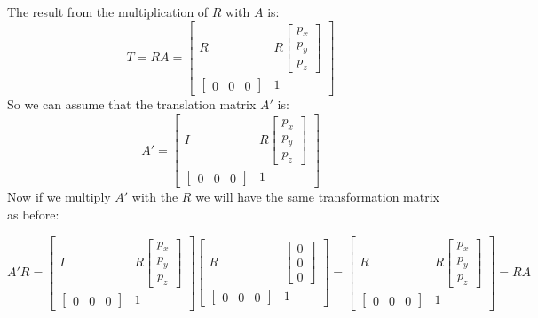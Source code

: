 The result from the multiplication of \(R\) with \(A\) is:
\[
T = RA = 
\begin{bmatrix}
R &  R\begin{bmatrix} p_x\\p_y\\p_z \end{bmatrix}\\
\begin{bmatrix}
0 & 0 & 0
\end{bmatrix} & 1
\end{bmatrix}
\]
So we can assume that the translation matrix \(A'\) is:
\[
A' = 
\begin{bmatrix}
I &  R\begin{bmatrix} p_x\\p_y\\p_z \end{bmatrix}\\
\begin{bmatrix}
0 & 0 & 0
\end{bmatrix} & 1
\end{bmatrix}
\]
Now if we multiply \(A'\) with the \(R\) we will have the same transformation matrix as before:
 
\[
A'R = 
\begin{bmatrix}
I &  R\begin{bmatrix} p_x\\p_y\\p_z \end{bmatrix}\\
\begin{bmatrix}
0 & 0 & 0
\end{bmatrix} & 1
\end{bmatrix}
\begin{bmatrix}
R &  \begin{bmatrix} 0\\0\\0 \end{bmatrix}\\
\begin{bmatrix}
0 & 0 & 0
\end{bmatrix} & 1
\end{bmatrix}
= 
\begin{bmatrix}
R &  R\begin{bmatrix} p_x\\p_y\\p_z \end{bmatrix}\\
\begin{bmatrix}
0 & 0 & 0
\end{bmatrix} & 1
\end{bmatrix} =
RA
\]

